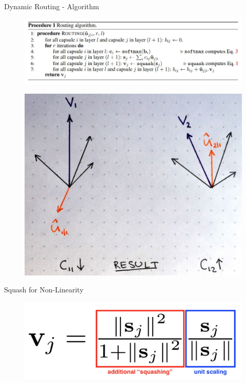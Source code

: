 \documentclass{beamer}
\begin{document}
\begin{frame}{Dynamic Routing - Algorithm}
    \begin{figure}[h]
        \centering
        \includegraphics[scale=0.8]{algorithm.JPG}
    \end{figure}
    \begin{figure}[h]
        \centering
        \includegraphics[scale = 0.15]{dr_dot.JPG}
        \end{figure}
\end{frame}

\begin{frame}{Squash for Non-Linearity}
\begin{figure}
    \centering
    \includegraphics[scale=0.5]{capsule_3.JPG}
\end{figure}
\end{frame}
\end{document}
